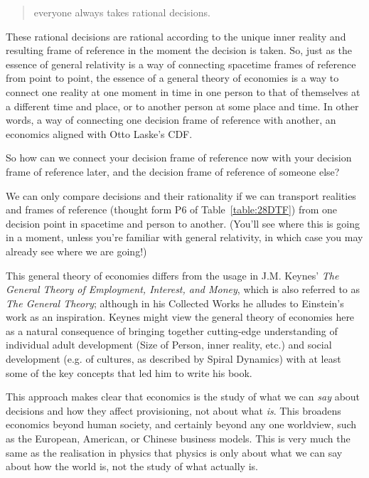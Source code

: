 \begin{quote}
everyone always takes rational decisions. 
\end{quote}


These rational decisions are rational according to the unique inner reality and resulting frame of reference in the moment the decision is taken. So, just as the essence of general relativity is a way of connecting spacetime frames of reference from point to point, the essence of a general theory of economies is a way to connect one reality at one moment in time in one person to that of themselves at a different time and place,  or to another person at some place and time. In other words, a way of connecting one decision frame of reference  with another, an economics aligned with Otto Laske's CDF.  


So how can we connect your decision frame of reference now with your decision frame of reference later, and the decision frame of reference of someone else?


We can only compare decisions and their rationality if we can transport realities and frames of reference  (thought form P6 of Table~\ref{table:28DTF}) from one decision point in spacetime and person to another. (You'll see where this is going in a moment, unless you're familiar with general relativity, in which case you may already see where we are going!)


This general theory of economies  differs from the usage in J.M. Keynes’ \emph{The General Theory of Employment, Interest, and Money}\cite{keynes-general}, which is also referred to as \emph{The General Theory}; although in his Collected Works he alludes to Einstein’s work as an inspiration. Keynes  might view the general theory of economies here as a natural consequence of bringing together cutting\hyp{}edge understanding of individual adult development (Size of Person, inner reality, etc.) and  social development (e.g. of cultures, as described by Spiral Dynamics) with at least some of the key concepts that led him to write his book\cite{galbraith-keynes, keynes-collected-writing}.  


This approach makes clear that economics is the study of what we can \emph{say} about decisions and how they affect provisioning, not about what \emph{is}. This broadens economics beyond human society, and certainly beyond any one worldview, such as the European, American, or Chinese business models. This is very much the same as the realisation in physics that physics is only about what we can say about how the world is, not the study of what actually is.


